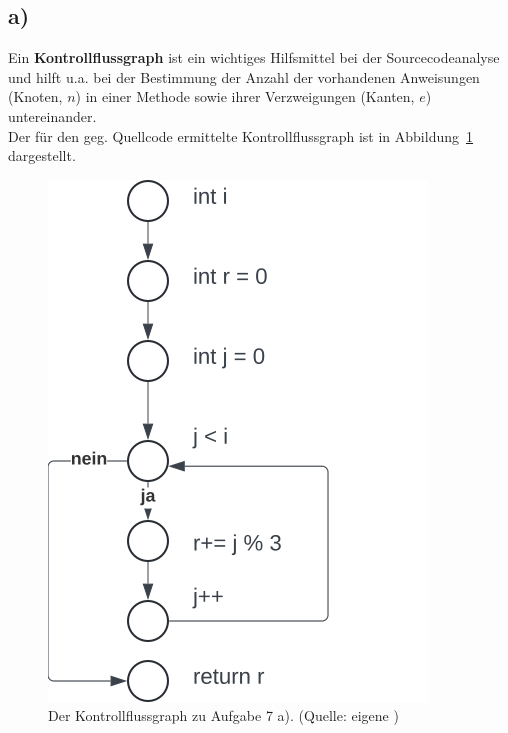 \subsection*{a)}


Ein \textbf{Kontrollflussgraph} ist ein wichtiges Hilfsmittel bei der Sourcecodeanalyse und hilft u.a. bei der Bestimmung der Anzahl der vorhandenen Anweisungen (Knoten, $n$) in  einer Methode sowie ihrer Verzweigungen (Kanten, $e$) untereinander.\\
Der für den geg. Quellcode ermittelte Kontrollflussgraph ist in Abbildung~\ref{fig:kontrollflussgraph} dargestellt.

\begin{figure}
    \centering
    \includegraphics[scale=0.6]{chapters/aufgabe 7/img/kontrollflussgraph}
    \caption{Der Kontrollflussgraph zu Aufgabe 7 a). (Quelle: eigene )}
    \label{fig:kontrollflussgraph}
\end{figure}
